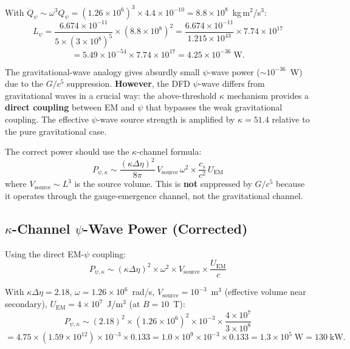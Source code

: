 \documentclass[11pt,a4paper]{article}
\begin{document}
With $\dddot{Q}_\psi \sim \omega^3 Q_\psi = (1.26 \times 10^6)^3 \times 4.4 \times 10^{-10}
= 8.8 \times 10^8$~kg\,m$^2$/s$^3$:
\begin{equation}
L_\psi = \frac{6.674 \times 10^{-11}}{5 \times (3 \times 10^8)^5}
\times (8.8 \times 10^8)^2
= \frac{6.674 \times 10^{-11}}{1.215 \times 10^{43}}
\times 7.74 \times 10^{17}
\end{equation}
\begin{equation}
= 5.49 \times 10^{-54} \times 7.74 \times 10^{17} = 4.25 \times 10^{-36}\;\mathrm{W}.
\end{equation}

\begin{tcolorbox}[colback=yellow!5!white,colframe=yellow!75!black,title=Key Tension]
The gravitational-wave analogy gives absurdly small $\psi$-wave power ($\sim 10^{-36}$~W)
due to the $G/c^5$ suppression. \textbf{However}, the DFD $\psi$-wave differs from
gravitational waves in a crucial way: the above-threshold $\kappa$ mechanism provides
a \textbf{direct coupling} between EM and $\psi$ that bypasses the weak gravitational
coupling. The effective $\psi$-wave source strength is amplified by $\kappa = 51.4$
relative to the pure gravitational case.

The correct power should use the $\kappa$-channel formula:
\begin{equation}
P_{\psi,\kappa} \sim \frac{(\kappa\Delta\eta)^2}{8\pi}\,V_{\mathrm{source}}\,\omega^2
\times \frac{c_s}{c^2}\,U_{\mathrm{EM}}
\end{equation}
where $V_{\mathrm{source}} \sim L^3$ is the source volume. This is \textbf{not} suppressed
by $G/c^5$ because it operates through the gauge-emergence channel, not the gravitational channel.
\end{tcolorbox}

\subsection{$\kappa$-Channel $\psi$-Wave Power (Corrected)}

Using the direct EM-$\psi$ coupling:
\begin{equation}
P_{\psi,\kappa} \sim (\kappa\Delta\eta)^2 \times \omega^2 \times V_{\mathrm{source}}
\times \frac{U_{\mathrm{EM}}}{c}
\end{equation}

With $\kappa\Delta\eta = 2.18$, $\omega = 1.26 \times 10^6$~rad/s,
$V_{\mathrm{source}} = 10^{-3}$~m$^3$ (effective volume near secondary),
$U_{\mathrm{EM}} = 4 \times 10^7$~J/m$^3$ (at $B = 10$~T):
\begin{equation}
P_{\psi,\kappa} \sim (2.18)^2 \times (1.26 \times 10^6)^2 \times 10^{-3}
\times \frac{4 \times 10^7}{3 \times 10^8}
\end{equation}
\begin{equation}
= 4.75 \times (1.59 \times 10^{12}) \times 10^{-3} \times 0.133
= 1.0 \times 10^9 \times 10^{-3} \times 0.133
= 1.3 \times 10^5\;\mathrm{W} = 130\;\mathrm{kW}.
\end{equation}
\end{document}
